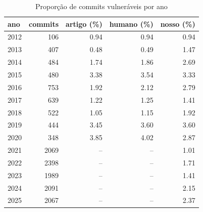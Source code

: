 \begin{table}[htbp]
\centering
\caption{Proporção de commits vulneráveis por ano}
\label{tab:per_year}
\begin{tabular}{lrrrr}
\toprule
ano & commits & artigo (\%) & humano (\%) & nosso (\%) \\
\midrule
2012 & 106 & 0.94 & 0.94 & 0.94 \\
2013 & 407 & 0.48 & 0.49 & 1.47 \\
2014 & 484 & 1.74 & 1.86 & 2.69 \\
2015 & 480 & 3.38 & 3.54 & 3.33 \\
2016 & 753 & 1.92 & 2.12 & 2.79 \\
2017 & 639 & 1.22 & 1.25 & 1.41 \\
2018 & 522 & 1.05 & 1.15 & 1.92 \\
2019 & 444 & 3.45 & 3.60 & 3.60 \\
2020 & 348 & 3.85 & 4.02 & 2.87 \\
2021 & 2069 & -- & -- & 1.01 \\
2022 & 2398 & -- & -- & 1.71 \\
2023 & 1989 & -- & -- & 1.41 \\
2024 & 2091 & -- & -- & 2.15 \\
2025 & 2067 & -- & -- & 2.37 \\
\bottomrule
\end{tabular}
\end{table}
